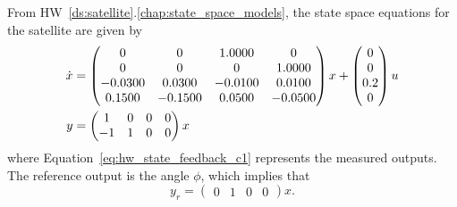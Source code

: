 
From HW~\ref{ds:satellite}.\ref{chap:state_space_models}, the state space equations for the satellite are given by
\begin{align}
\dot{x} &= \begin{pmatrix}
         0  &       0 &   1.0000 &        0 \\
         0  &       0 &        0 &   1.0000 \\
   -0.0300  &  0.0300 &  -0.0100 &   0.0100 \\
    0.1500  & -0.1500 &   0.0500 &  -0.0500 
\end{pmatrix} x + \begin{pmatrix}
     0 \\
     0 \\
0.2 \\
     0 \\
\end{pmatrix} u \notag \\
y &= \begin{pmatrix}
1 & 0 & 0 & 0 \\
-1 & 1 & 0 & 0 
\end{pmatrix} x\label{eq:hw_state_feedback_c1}
\end{align}
where Equation~\eqref{eq:hw_state_feedback_c1} represents the measured outputs.  The reference output is the angle $\phi$, which implies that
\[
y_r = \begin{pmatrix} 0 & 1 & 0 & 0 \end{pmatrix} x.
\]
